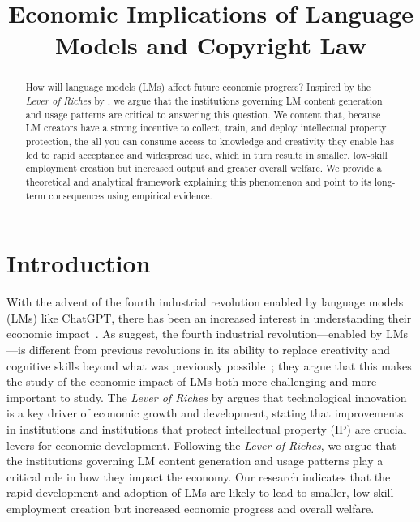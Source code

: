 
\title{Economic Implications of Language Models and Copyright Law}

\begin{abstract}
How will language models (LMs) affect future economic progress?
Inspired by the \emph{Lever of Riches} by \citet{mokyr1992lever}, we argue that the institutions governing LM content generation and usage patterns are critical to answering this question.
We content that, because LM creators have a strong incentive to collect, train, and deploy intellectual property protection, the all-you-can-consume access to knowledge and creativity they enable has led to rapid acceptance and widespread use, which in turn results in smaller, low-skill employment creation but increased output and greater overall welfare.
We provide a theoretical and analytical framework explaining this phenomenon and point to its long-term consequences using empirical evidence.
\end{abstract}

\section{Introduction}


\label{Intro}

With the advent of the fourth industrial revolution enabled by language models (LMs) like ChatGPT, there has been an increased interest in understanding their economic impact~\citep{Howard2019artificial, autor2019model, autor2015there, hui2024short, felten2023will, eloundou2023gpts, paslar2023role}.
As \citet{boiko2023emergent} suggest, the fourth industrial revolution---enabled by LMs---is different from previous revolutions in its ability to replace creativity and cognitive skills beyond what was previously possible~\citep{autor2023machine}; they argue that this makes the study of the economic impact of LMs both more challenging and more important to study.
The \emph{Lever of Riches} by \citet{mokyr1992lever} argues that technological innovation is a key driver of economic growth and development, stating that improvements in institutions and institutions that protect intellectual property (IP) are crucial levers for economic development.
Following the \emph{Lever of Riches}, we argue that the institutions governing LM content generation and usage patterns play a critical role in how they impact the economy.
Our research indicates that the rapid development and adoption of LMs are likely to lead to smaller, low-skill employment creation but increased economic progress and overall welfare. 

